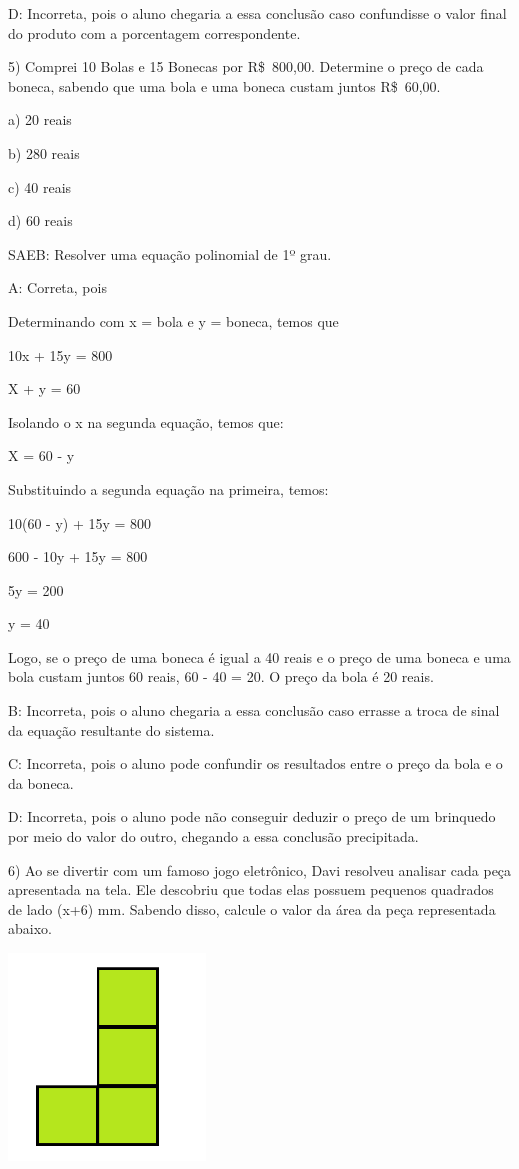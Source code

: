 D: Incorreta, pois o aluno chegaria a essa conclusão caso confundisse o
valor final do produto com a porcentagem correspondente.

5) Comprei 10 Bolas e 15 Bonecas por R\$~800,00. Determine o preço de
cada boneca, sabendo que uma bola e uma boneca custam juntos R\$~60,00.

a) 20 reais

b) 280 reais

c) 40 reais

d) 60 reais

SAEB: Resolver uma equação polinomial de 1º grau.

A: Correta, pois

Determinando com x = bola e y = boneca, temos que

10x + 15y = 800

X + y = 60

Isolando o x na segunda equação, temos que:

X = 60 - y

Substituindo a segunda equação na primeira, temos:

10(60 - y) + 15y = 800

600 - 10y + 15y = 800

5y = 200

y = 40

Logo, se o preço de uma boneca é igual a 40 reais e o preço de uma
boneca e uma bola custam juntos 60 reais, 60 - 40 = 20. O preço da bola
é 20 reais.

B: Incorreta, pois o aluno chegaria a essa conclusão caso errasse a
troca de sinal da equação resultante do sistema.

C: Incorreta, pois o aluno pode confundir os resultados entre o preço da
bola e o da boneca.

D: Incorreta, pois o aluno pode não conseguir deduzir o preço de um
brinquedo por meio do valor do outro, chegando a essa conclusão
precipitada.

6) Ao se divertir com um famoso jogo eletrônico, Davi resolveu analisar
cada peça apresentada na tela. Ele descobriu que todas elas possuem
pequenos quadrados de lado (x+6) mm. Sabendo disso, calcule o valor da
área da peça representada abaixo.

\includegraphics[width=2.05833in,height=2.16573in]{./imgSAEB_8_MAT/media/image57.png}

